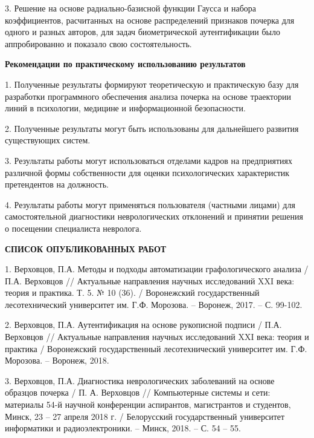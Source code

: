3. Решение на основе радиально-базисной функции Гаусса и набора коэффициентов, расчитанных на основе распределений признаков почерка для одного и разных авторов, для задач биометрической аутентификации было аппробированно и показало свою состоятельность.

\bigskip
\textbf{Рекомендации по практическому использованию результатов}
\bigskip

1. Полученные результаты формируют теоретическую и практическую базу для разработки программного обеспечения анализа почерка на основе траектории линий в психологии, медицине и информационной безопасности.

2. Полученные результаты могут быть использованы для дальнейшего развития существующих систем.

3. Результаты работы могут использоваться отделами кадров на предприятиях различной формы собственности для оценки психологических характеристик претендентов на должность.

4. Результаты работы могут применяться пользователя (частными лицами) для самостоятельной диагностики неврологических отклонений и принятии решения о посещении специалиста невролога.

\clearpage

\begin{center}
{\bfseries СПИСОК ОПУБЛИКОВАННЫХ РАБОТ}
\end{center}

1. Верховцов, П.А. Методы и подходы автоматизации графологического анализа / П.А. Верховцов // Актуальные направления научных исследований XXI века: теория и практика. Т. 5. № 10 (36). / Воронежский государственный лесотехнический университет им. Г.Ф. Морозова. – Воронеж, 2017. – С. 99-102.

2. Верховцов, П.А. Аутентификация на основе рукописной подписи / П.А. Верховцов // Актуальные направления научных исследований XXI века: теория и практика / Воронежский государственный лесотехнический университет им. Г.Ф. Морозова. – Воронеж, 2018.

3. Верховцов, П.А. Диагностика неврологических заболеваний на основе образцов почерка / П. А. Верховцов // Компьютерные системы и сети: материалы 54-й научной конференции аспирантов, магистрантов и студентов, Минск, 23 – 27 апреля 2018 г. / Белорусский государственный университет информатики и радиоэлектроники. – Минск, 2018. – С. 54 – 55.

\clearpage